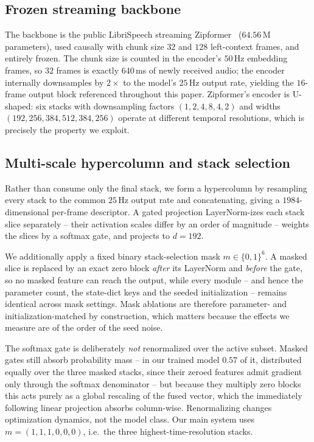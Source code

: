 \documentclass[journal]{IEEEtran}
\begin{document}
\subsection{Frozen streaming backbone}
The backbone is the public LibriSpeech streaming
Zipformer~\cite{yao2024zipformer} ($64.56$\,M parameters), used causally
with chunk size $32$ and $128$ left-context frames, and entirely frozen.
The chunk size is counted in the encoder's $50$\,Hz embedding frames, so
$32$ frames is exactly $640$\,ms of newly received audio; the encoder
internally downsamples by $2\times$ to the model's $25$\,Hz output rate,
yielding the $16$-frame output block referenced throughout this paper.
Zipformer's encoder is U-shaped: six stacks with downsampling factors
$(1,2,4,8,4,2)$ and widths $(192,256,384,512,384,256)$ operate at different
temporal resolutions, which is precisely the property we exploit.

\subsection{Multi-scale hypercolumn and stack selection}
\label{sec:hypercolumn}
Rather than consume only the final stack, we form a hypercolumn by
resampling every stack to the common $25$\,Hz output rate and concatenating,
giving a $1984$-dimensional per-frame descriptor. A gated projection
LayerNorm-izes each stack slice separately -- their activation scales differ
by an order of magnitude -- weights the slices by a softmax gate, and
projects to $d\!=\!192$.

We additionally apply a fixed binary stack-selection mask
$m \in \{0,1\}^{6}$. A masked slice is replaced by an exact zero block
\emph{after} its LayerNorm and \emph{before} the gate, so no masked feature
can reach the output, while every module -- and hence the parameter count,
the state-dict keys and the seeded initialization -- remains identical
across mask settings. Mask ablations are therefore parameter- and
initialization-matched by construction, which matters because the effects we
measure are of the order of the seed noise.

The softmax gate is deliberately \emph{not} renormalized over the active
subset. Masked gates still absorb probability mass -- in our trained model
$0.57$ of it, distributed equally over the three masked stacks, since their
zeroed features admit gradient only through the softmax denominator -- but
because they multiply zero blocks this acts purely as a global rescaling of
the fused vector, which the immediately following linear projection absorbs
column-wise. Renormalizing changes optimization dynamics, not the model
class. Our main system uses $m=(1,1,1,0,0,0)$, i.e.\ the three
highest-time-resolution stacks.
\end{document}
